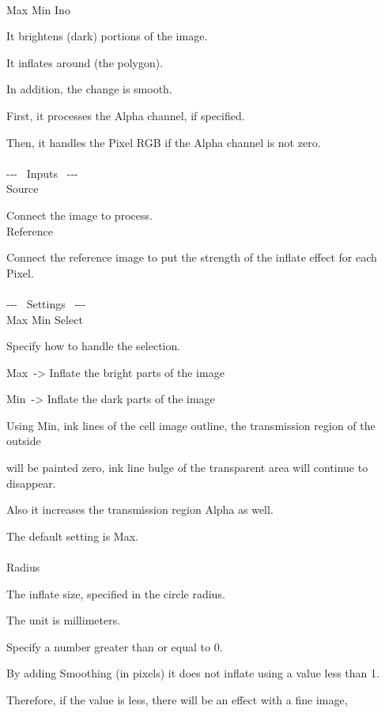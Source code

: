 \documentclass[a4paper,12pt]{article}
\begin{document}
\thispagestyle{empty}

\Large
\noindent \\
Max Min Ino\medskip
\par
\normalsize
It brightens (dark) portions of the image.\\
\par
It inflates around (the polygon).\par
In addition, the change is smooth.\\
\par
First, it processes the Alpha channel, if specified.\par
Then, it handles the Pixel RGB if the Alpha channel is not zero.\\
\\
-{-}- \ Inputs \ -{-}-\\
Source\par
Connect the image to process.\\
Reference\par
Connect the reference image to put the strength of the inflate effect for each Pixel.\\
\\
-{-}- \ Settings \ -{-}-\\
Max Min Select\par
Specify how to handle the selection.\par
\textquotedbl Max\textquotedbl \ -> Inflate the bright parts of the image\par
\textquotedbl Min\textquotedbl \ -> Inflate the dark parts of the image\par
Using \textquotedbl Min\textquotedbl , ink lines of the cell image outline, the transmission region of the outside\par
will be painted zero, ink line bulge of the transparent area will continue to disappear.\par
Also it increases the transmission region Alpha as well.\par
The default setting is \textquotedbl Max\textquotedbl .\\
\\
Radius\par
The inflate size, specified in the circle radius.\par
The unit is millimeters.\par
Specify a number greater than or equal to 0.\par
By adding Smoothing (in pixels) it does not inflate using a value less than 1.\par
Therefore, if the value is less, there will be an effect with a fine image,\par
\end{document}
